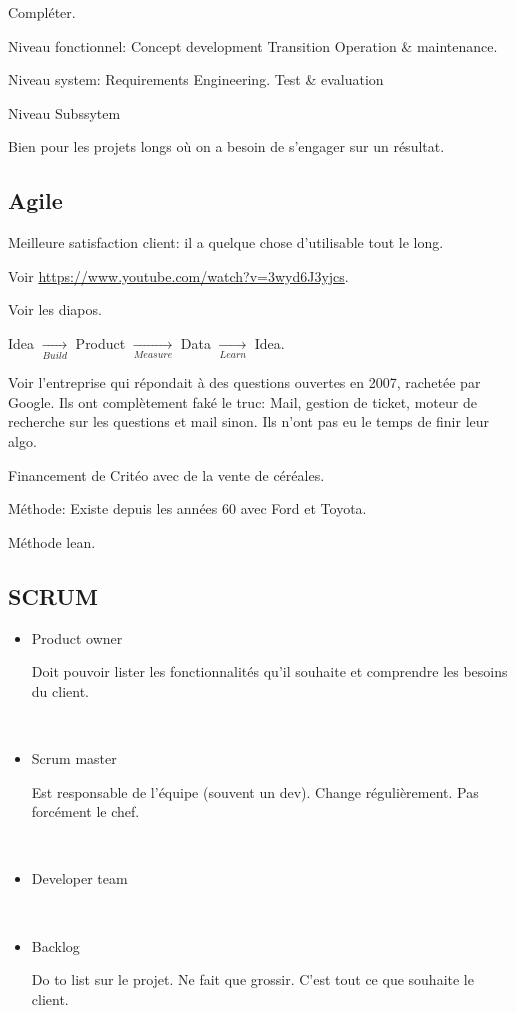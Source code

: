 \documentclass[a4paper,11pt]{article}
\begin{document}
Compléter.

Niveau fonctionnel: Concept development \quad Transition Operation \& maintenance.

Niveau system: Requirements Engineering. \quad Test \& evaluation

Niveau Subssytem

Bien pour les projets longs où on a besoin de s'engager sur un résultat.

\subsection{Agile}

Meilleure satisfaction client: il a quelque chose d'utilisable tout le long.

Voir \url{https://www.youtube.com/watch?v=3wyd6J3yjcs}.

Voir les diapos.

Idea $\underset{Build}{\longrightarrow}$ Product $\underset{Measure}
{\longrightarrow}$ Data $\underset{Learn}{\longrightarrow}$ Idea.

Voir l'entreprise qui répondait à des questions ouvertes en 2007, rachetée par
Google. Ils ont complètement faké le truc: Mail, gestion de ticket, moteur de
recherche sur les questions et mail sinon. Ils n'ont pas eu le temps de finir
leur algo.

Financement de Critéo avec de la vente de céréales.

Méthode: Existe depuis les années 60 avec Ford et Toyota.

Méthode lean.

\subsection{SCRUM}

\begin{itemize}

\item Product owner

  Doit pouvoir lister les fonctionnalités qu'il souhaite et comprendre les
  besoins du client.

  \

\item Scrum master

  Est responsable de l'équipe (souvent un dev). Change régulièrement. Pas
  forcément le chef.

  \

\item Developer team

  \

\item Backlog

  Do to list sur le projet. Ne fait que grossir. C'est tout ce que souhaite le
  client.

  \

\end{itemize}
\end{document}
